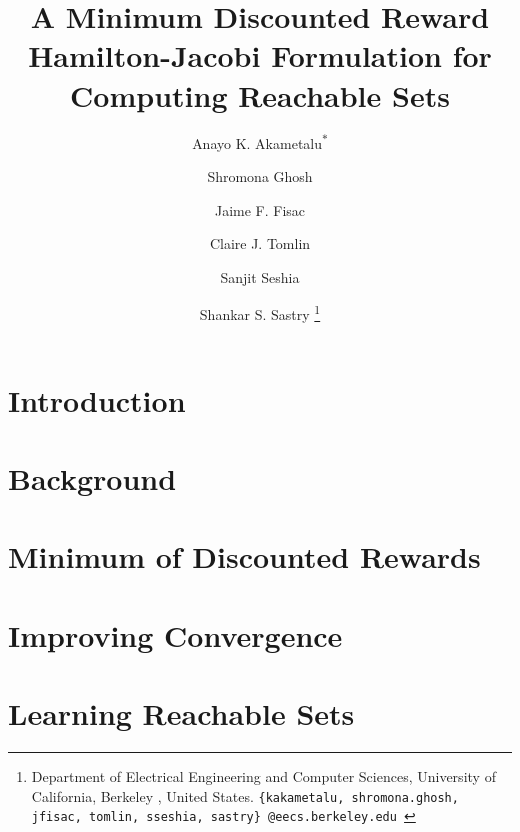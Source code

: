 \documentclass[letterpaper, 10 pt, conference]{ieeeconf}
\title{\LARGE \bf
A Minimum Discounted Reward Hamilton-Jacobi Formulation for Computing Reachable Sets 
}
\author{
Anayo K. Akametalu\textsuperscript{$*$} \and Shromona Ghosh \and Jaime F. Fisac \and Claire J. Tomlin \and Sanjit Seshia \and Shankar S. Sastry
\thanks{
 Department of Electrical Engineering and Computer Sciences, 
        University of California, Berkeley , United States.\newline
        {\tt\small \{kakametalu, shromona.ghosh, jfisac, tomlin, sseshia, sastry\}~@eecs.berkeley.edu }}%
}
\begin{document}
\maketitle
\thispagestyle{empty}
\pagestyle{empty}



\section{Introduction \label{sec:intro}}


\section{Background \label{sec:back}} 


\section {Minimum of Discounted Rewards \label{sec:mdr}}


\section{Improving Convergence \label{sec:conv}}


\section{Learning Reachable Sets \label{sec:learn}}

\end{document}
